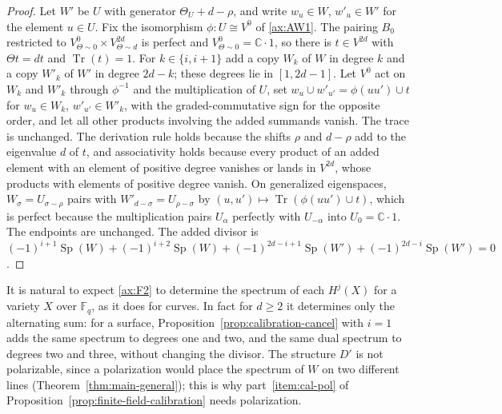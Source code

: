 \documentclass[11pt]{amsart}
\theoremstyle{plain}
\theoremstyle{definition}
\theoremstyle{remark}
\numberwithin{equation}{section}
\newcommand{\C}{\mathbb{C}}
\newcommand{\F}{\mathbb{F}}
\DeclareMathOperator{\Tr}{Tr}
\begin{document}
\begin{proof}
Let $W'$ be $U$ with generator $\Theta_U+d-\rho$, and write
$w_u\in W$, $w'_u\in W'$ for the element $u\in U$. Fix the isomorphism
$\phi:U\cong V^0$ of \ref{ax:AW1}. The pairing $B_0$ restricted to
$V^0_{\Theta\sim0}\times V^{2d}_{\Theta\sim d}$ is perfect and
$V^0_{\Theta\sim0}=\C\cdot1$, so there is $t\in V^{2d}$ with
$\Theta t=dt$ and $\Tr(t)=1$. For $k\in\{i,i+1\}$ add a copy $W_k$ of
$W$ in degree $k$ and a copy $W'_k$ of $W'$ in degree $2d-k$; these
degrees lie in $[1,2d-1]$. Let $V^0$ act on $W_k$ and $W'_k$ through
$\phi^{-1}$ and the multiplication of $U$, set
$w_u\cup w'_{u'}=\phi(uu')\cup t$ for $w_u\in W_k$,
$w'_{u'}\in W'_k$, with the graded-commutative sign for the opposite
order, and let all other products involving the added summands
vanish. The trace is unchanged. The derivation rule holds because the
shifts $\rho$ and $d-\rho$ add to the eigenvalue $d$ of $t$, and
associativity holds because every product of an added element with an
element of positive degree vanishes or lands in $V^{2d}$, whose
products with elements of positive degree vanish. On
generalized eigenspaces, $W_\sigma=U_{\sigma-\rho}$ pairs with
$W'_{d-\sigma}=U_{\rho-\sigma}$ by $(u,u')\mapsto\Tr(\phi(uu')\cup
t)$, which is perfect because the multiplication pairs
$U_\alpha$ perfectly with $U_{-\alpha}$ into $U_0=\C\cdot1$. The
endpoints are unchanged. The added divisor is
$(-1)^{i+1}\operatorname{Sp}(W)+(-1)^{i+2}\operatorname{Sp}(W)
+(-1)^{2d-i+1}\operatorname{Sp}(W')+(-1)^{2d-i}\operatorname{Sp}(W')=0$.
\end{proof}

It is natural to expect \ref{ax:F2} to determine the spectrum of each
$H^j(X)$ for a variety $X$ over $\F_q$, as it does for curves. In fact
for $d\ge2$ it determines only the alternating sum: for a surface,
Proposition~\ref{prop:calibration-cancel} with $i=1$ adds the same
spectrum to degrees one and two, and the same dual spectrum to degrees
two and three, without changing the divisor. The structure $D'$ is not
polarizable, since a polarization would place the spectrum of $W$ on
two different lines (Theorem~\ref{thm:main-general}); this is why
part~\eqref{item:cal-pol} of
Proposition~\ref{prop:finite-field-calibration} needs polarization.
\end{document}
